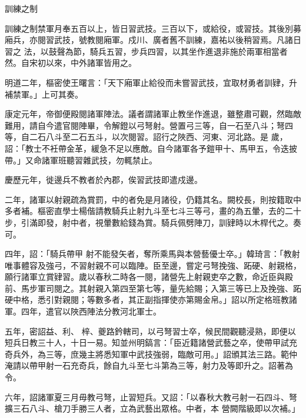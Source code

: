 
\begin{pinyinscope}

 訓練之制



 訓練之制禁軍月奉五百以上，皆日習武技。三百以下，或給役，或習技。其後別募廂兵，亦閱習武技，號教閱廂軍。戍川、廣者舊不訓練，嘉祐以後稍習焉。凡諸日習之
 法，以鼓聲為節，騎兵五習，步兵四習，以其坐作進退非施於兩軍相當者然。自宋初以來，中外諸軍皆用之。



 明道二年，樞密使王曙言：「天下廂軍止給役而未嘗習武技，宜取材勇者訓肄，升補禁軍。」上可其奏。



 康定元年，帝御便殿閱諸軍陣法。議者謂諸軍止教坐作進退，雖整肅可觀，然臨敵難用，請自今遣官閱陣畢，令解鐙以弓弩射。營置弓三等，自一石至八斗；弩四等，自二石八斗至二石五斗，以次閱習。詔行之陜西、河東、河北路。是
 歲，詔：「教士不衽帶金革，緩急不足以應敵。自今諸軍各予鎧甲十、馬甲五，令迭披帶。」又命諸軍班聽習雜武技，勿輒禁止。



 慶歷元年，徙邊兵不教者於內郡，俟習武技即遣戍邊。



 二年，諸軍以射親疏為賞罰，中的者免是月諸役，仍籍其名。闕校長，則按籍取中多者補。樞密直學士楊偕請教騎兵止射九斗至七斗三等弓，畫的為五暈，去的二十步，引滿即發，射中者，視暈數給錢為賞。騎兵佩劈陣刀，訓肄時以木桿代之。奏可。



 四年，詔：「騎兵帶甲
 射不能發矢者，奪所乘馬與本營藝優士卒。」韓琦言：「教射唯事體容及強弓，不習射親不可以臨陣。臣至邊，嘗定弓弩挽強、跖硬、射親格，願行諸軍立賞肄習。歲以春秋二時各一閱，諸營先上射親吏卒之數，命近臣與殿前、馬步軍司閱之。其射親入第四至第七等，量先給賜；入第三等已上及挽強、跖硬中格，悉引對親閱；等數多者，其正副指揮使亦第賜金帛。」詔以所定格班教諸軍。四年，遣官以陜西陣法分教河北軍士。



 五年，密詔益、利、
 梓、夔路鈐轄司，以弓弩習士卒，候民間觀聽浸熟，即便以短兵日教三十人，十日一易。知並州明鎬言：「臣近籍諸營武藝之卒，使帶甲試充奇兵外，為三等，庶幾主將悉知軍中武技強弱，臨敵可用。」詔頒其法三路。範仲淹請以帶甲射一石充奇兵，餘自九斗至七斗第為三等，射力及等即升之。詔著為令。



 六年，詔諸軍夏三月毋教弓弩，止習短兵。又詔：「以春秋大教弓射一石四斗、弩擴三石八斗、槍刀手勝三人者，立為武藝出眾格。中者，本
 營闕階級即以次補。」




\end{pinyinscope}
